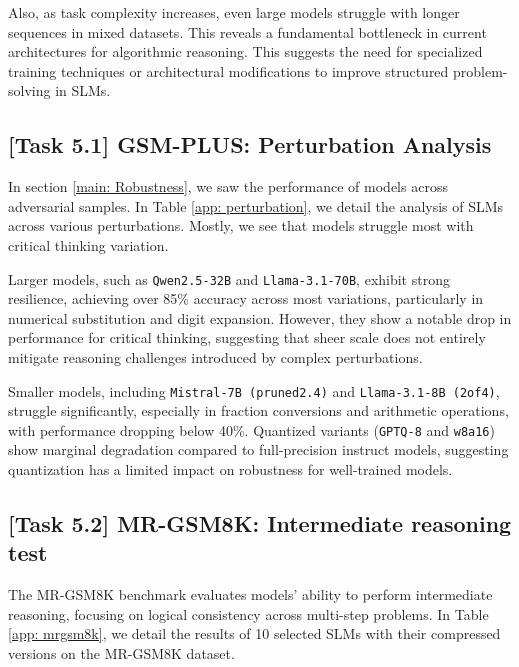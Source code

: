 Also, as task complexity increases, even large models struggle with longer sequences in mixed datasets. This reveals a fundamental bottleneck in current architectures for algorithmic reasoning. This suggests the need for specialized training techniques or architectural modifications to improve structured problem-solving in SLMs.


\subsection{[Task 5.1] GSM-PLUS: Perturbation Analysis}


In section \ref{main: Robustness}, we saw the performance of models across adversarial samples. In Table \ref{app: perturbation}, we detail the analysis of SLMs across various perturbations. Mostly, we see that models struggle most with critical thinking variation. \medskip

Larger models, such as \texttt{Qwen2.5-32B} and \texttt{Llama-3.1-70B}, exhibit strong resilience, achieving over 85\% accuracy across most variations, particularly in numerical substitution and digit expansion. However, they show a notable drop in performance for critical thinking, suggesting that sheer scale does not entirely mitigate reasoning challenges introduced by complex perturbations.\medskip

Smaller models, including \texttt{Mistral-7B (pruned2.4)} and \texttt{Llama-3.1-8B (2of4)}, struggle significantly, especially in fraction conversions and arithmetic operations, with performance dropping below 40\%. Quantized variants (\texttt{GPTQ-8} and \texttt{w8a16}) show marginal degradation compared to full-precision instruct models, suggesting quantization has a limited impact on robustness for well-trained models. 


\subsection{[Task 5.2] MR-GSM8K: Intermediate reasoning test}
\label{app: [Task 5.2] MR-GSM8K: Intermediate reasoning test}
The MR-GSM8K benchmark evaluates models' ability to perform intermediate reasoning, focusing on logical consistency across multi-step problems. In Table \ref{app: mrgsm8k}, we detail the results of 10 selected SLMs with their compressed versions on the MR-GSM8K dataset.\medskip

